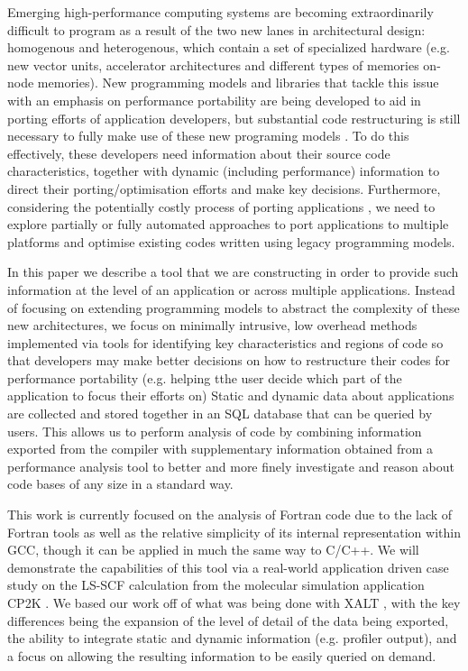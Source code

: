 Emerging high-performance computing systems are becoming extraordinarily difficult to program as a result of the  
two new lanes in architectural design:  homogenous and heterogenous, which contain a set of specialized 
hardware (e.g. new vector units,  accelerator architectures and different types of memories on-node memories). 
New programming models and libraries that tackle this issue with an emphasis on performance portability are 
being developed to aid in porting efforts of application developers, but substantial code restructuring is still 
necessary to fully make use of these new programing models \cite{anantharaj2013}\cite{titan}.
To do this effectively, these developers need information about their source code characteristics, together with 
dynamic (including performance) information to direct their porting/optimisation efforts and make key decisions.
Furthermore, considering the potentially costly process of porting applications \cite{larrea2016early}, we need to 
explore partially or fully automated approaches to port applications to multiple platforms and optimise existing 
codes written using legacy programming models.

In this paper we describe a tool that we are constructing in order to provide such information at the level of an 
application or across multiple applications.
Instead of focusing on extending programming models to abstract the complexity of these new architectures, we 
focus on minimally intrusive, low overhead methods implemented via tools for identifying key characteristics and 
regions of code so that developers may make better decisions on how to restructure their codes for performance 
portability (e.g. helping tthe user decide which part of the application to focus their efforts on)
Static and dynamic data about applications are collected and stored together in an \acs{SQL} database that can be 
queried by users.
This allows us to perform analysis of code by combining information exported from the compiler with 
supplementary information obtained from a performance analysis tool to better and more finely investigate and 
reason about code bases of any size in a standard way.

This work is currently focused on the analysis of Fortran code due to the lack of Fortran tools as well as the relative 
simplicity of its internal representation within \acs{GCC}, though it can be applied in much the same way to C/C++.
We will demonstrate the capabilities of this tool via a real-world application driven case study on the \ac{LS-SCF} 
calculation \cite{vandevondele2012linear} from the molecular simulation application CP2K \cite{hutter2014cp2k}.
We based our work off of what was being done with XALT \cite{7081224}, with the key differences being the 
expansion of the level of detail of the data being exported, the ability to integrate static and dynamic information 
(e.g. profiler output), and a focus on allowing the resulting information to be easily queried on demand.

